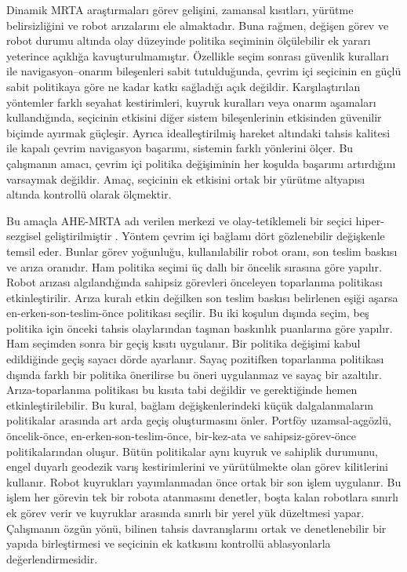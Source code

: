 \documentclass[10pt,letterpaper,onecolumn]{IEEEtran}
\begin{document}
Dinamik MRTA araştırmaları görev gelişini, zamansal kısıtları, yürütme
belirsizliğini ve robot arızalarını ele almaktadır. Buna rağmen, değişen görev
ve robot durumu altında olay düzeyinde politika seçiminin ölçülebilir ek yararı
yeterince açıklığa kavuşturulmamıştır. Özellikle seçim sonrası güvenlik kuralları ile
navigasyon--onarım bileşenleri sabit tutulduğunda, çevrim içi seçicinin en güçlü
sabit politikaya göre ne kadar katkı sağladığı açık değildir. Karşılaştırılan
yöntemler farklı seyahat kestirimleri, kuyruk kuralları veya onarım aşamaları
kullandığında, seçicinin etkisini diğer sistem bileşenlerinin etkisinden
güvenilir biçimde ayırmak güçleşir. Ayrıca idealleştirilmiş hareket
altındaki tahsis kalitesi ile kapalı çevrim navigasyon başarımı, sistemin farklı
yönlerini ölçer. Bu çalışmanın amacı, çevrim içi politika değişiminin her koşulda
başarımı artırdığını varsaymak değildir. Amaç, seçicinin ek etkisini ortak bir
yürütme altyapısı altında kontrollü olarak ölçmektir.

Bu amaçla AHE-MRTA adı verilen merkezi ve olay-tetiklemeli bir seçici
hiper-sezgisel geliştirilmiştir \cite{burke2013hyper}. Yöntem çevrim içi bağlamı
dört gözlenebilir değişkenle temsil eder. Bunlar görev yoğunluğu, kullanılabilir
robot oranı, son teslim baskısı ve arıza oranıdır. Ham politika seçimi üç dallı
bir öncelik sırasına göre yapılır. Robot arızası algılandığında sahipsiz
görevleri önceleyen toparlanma politikası etkinleştirilir. Arıza kuralı etkin
değilken son teslim baskısı belirlenen eşiği aşarsa
en-erken-son-teslim-önce politikası seçilir. Bu iki koşulun dışında seçim, beş
politika için önceki tahsis olaylarından taşınan baskınlık puanlarına göre
yapılır. Ham seçimden sonra bir geçiş kısıtı uygulanır. Bir politika değişimi
kabul edildiğinde geçiş sayacı dörde ayarlanır. Sayaç pozitifken toparlanma
politikası dışında farklı bir politika önerilirse bu öneri uygulanmaz ve sayaç
bir azaltılır. Arıza-toparlanma politikası bu kısıta tabi değildir ve gerektiğinde
hemen etkinleştirilebilir. Bu kural, bağlam değişkenlerindeki küçük
dalgalanmaların politikalar arasında art arda geçiş oluşturmasını önler. Portföy
uzamsal-açgözlü, öncelik-önce, en-erken-son-teslim-önce, bir-kez-ata ve
sahipsiz-görev-önce politikalarından oluşur. Bütün politikalar aynı kuyruk ve
sahiplik durumunu, engel duyarlı geodezik varış kestirimlerini ve yürütülmekte
olan görev kilitlerini kullanır. Robot kuyrukları yayımlanmadan önce ortak bir
son işlem uygulanır. Bu işlem her görevin tek bir robota atanmasını denetler,
boşta kalan robotlara sınırlı ek görev verir ve kuyruklar arasında sınırlı bir
yerel yük düzeltmesi yapar. Çalışmanın özgün yönü, bilinen tahsis davranışlarını
ortak ve denetlenebilir bir yapıda birleştirmesi ve seçicinin ek katkısını
kontrollü ablasyonlarla değerlendirmesidir.
\end{document}
